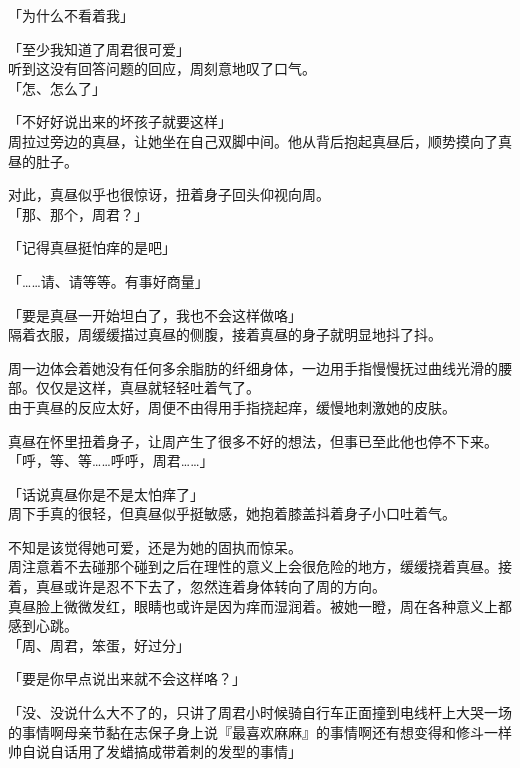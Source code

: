 「为什么不看着我」

「至少我知道了周君很可爱」\\

听到这没有回答问题的回应，周刻意地叹了口气。\\

「怎、怎么了」

「不好好说出来的坏孩子就要这样」\\

周拉过旁边的真昼，让她坐在自己双脚中间。他从背后抱起真昼后，顺势摸向了真昼的肚子。

对此，真昼似乎也很惊讶，扭着身子回头仰视向周。\\

「那、那个，周君？」

「记得真昼挺怕痒的是吧」

「……请、请等等。有事好商量」

「要是真昼一开始坦白了，我也不会这样做咯」\\

隔着衣服，周缓缓描过真昼的侧腹，接着真昼的身子就明显地抖了抖。

周一边体会着她没有任何多余脂肪的纤细身体，一边用手指慢慢抚过曲线光滑的腰部。仅仅是这样，真昼就轻轻吐着气了。\\

由于真昼的反应太好，周便不由得用手指挠起痒，缓慢地刺激她的皮肤。

真昼在怀里扭着身子，让周产生了很多不好的想法，但事已至此他也停不下来。\\

「呼，等、等……呼呼，周君……」

「话说真昼你是不是太怕痒了」\\

周下手真的很轻，但真昼似乎挺敏感，她抱着膝盖抖着身子小口吐着气。

不知是该觉得她可爱，还是为她的固执而惊呆。\\

周注意着不去碰那个碰到之后在理性的意义上会很危险的地方，缓缓挠着真昼。接着，真昼或许是忍不下去了，忽然连着身体转向了周的方向。\\

真昼脸上微微发红，眼睛也或许是因为痒而湿润着。被她一瞪，周在各种意义上都感到心跳。\\

「周、周君，笨蛋，好过分」

「要是你早点说出来就不会这样咯？」

「没、没说什么大不了的，只讲了周君小时候骑自行车正面撞到电线杆上大哭一场的事情啊母亲节黏在志保子身上说『最喜欢麻麻』的事情啊还有想变得和修斗一样帅自说自话用了发蜡搞成带着刺的发型的事情」

